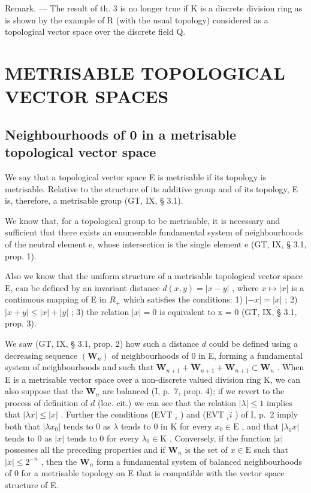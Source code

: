 Remark. --- The result of th. 3 is no longer true if K is a discrete division ring as is shown by the example of R (with the usual topology) considered as a topological vector space over the discrete field Q.

\section{METRISABLE TOPOLOGICAL VECTOR SPACES}

\subsection{Neighbourhoods of 0 in a metrisable topological vector space}

We say that a topological vector space E is metrisable if its topology is metrisable. Relative to the structure of its additive group and of its topology, E is, therefore, a metrisable group (GT, IX, § 3.1).

We know that, for a topological group to be metrisable, it is necessary and sufficient that there exists an enumerable fundamental system of neighbourhoods of the neutral element e, whose intersection is the single element e (GT, IX, § 3.1, prop. 1).

Also we know that the uniform structure of a metrisable topological vector space E, can be defined by an invariant distance \(d(x, y) = |x - y|\) , where \(x \mapsto |x|\) is a continuous mapping of E in \(R_{+}\) which satisfies the conditions: 1) \(|-x| = |x|\) ; 2) \(|x + y| \leqslant |x| + |y|\) ; 3) the relation \(|x| = 0\) is equivalent to x = 0 (GT, IX, § 3.1, prop. 3).

We saw (GT, IX, § 3.1, prop. 2) how such a distance \(d\) could be defined using a decreasing sequence \((\mathbf{W}_n)\) of neighbourhoods of 0 in E, forming a fundamental system of neighbourhoods and such that \(\mathbf{W}_{n+1} + \mathbf{W}_{n+1} + \mathbf{W}_{n+1} \subset \mathbf{W}_n\) . When E is a metrisable vector space over a non-discrete valued division ring K, we can also suppose that the \(\mathbf{W}_n\) are balanced (I, p.~7, prop. 4); if we revert to the process of definition of \(d\) (loc. cit.) we can see that the relation \(|\lambda| \leqslant 1\) implies that \(|\lambda x| \leqslant |x|\) . Further the conditions (EVT \(_i\) ) and (EVT \(_ii\) ) of I, p.~2 imply both that \(|\lambda x_0|\) tends to 0 as \(\lambda\) tends to 0 in K for every \(x_0 \in \mathrm{E}\) , and that \(|\lambda_0 x|\) tends to 0 as \(|x|\) tends to 0 for every \(\lambda_0 \in \mathrm{K}\) . Conversely, if the function \(|x|\) possesses all the preceding properties and if \(\mathbf{W}_n\) is the set of \(x \in \mathrm{E}\) such that \(|x| \leqslant 2^{-n}\) , then the \(\mathbf{W}_n\) form a fundamental system of balanced neighbourhoods of 0 for a metrisable topology on E that is compatible with the vector space structure of E.

